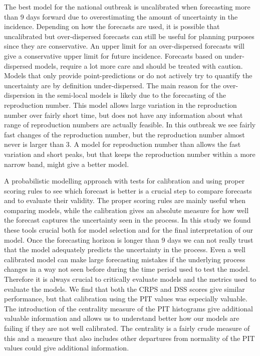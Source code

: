 \documentclass[12pt]{article}
\begin{document}
The best model for the national outbreak is uncalibrated when forecasting more than 9 days forward due to overestimating the amount of uncertainty in the incidence. Depending on how the forecasts are used, it is possible that uncalibrated but over-dispersed forecasts can still be useful for planning purposes since they are conservative. An upper limit for an over-dispersed forecasts will give a conservative upper limit for future incidence. Forecasts based on under-dispersed models, require a lot more care and should be treated with caution. Models that only provide point-predictions or do not actively try to quantify the uncertainty are by definition under-dispersed. The main reason for the over-dispersion in the semi-local models is likely due to the forecasting of the reproduction number. This model allows large variation in the reproduction number over fairly short time, but does not have any information about what range of reproduction numbers are actually feasible. In this outbreak we see fairly fast changes of the reproduction number, but the reproduction number almost never is larger than 3. A model for reproduction number than allows the fast variation and short peaks, but that keeps the reproduction number within a more narrow band, might give a better model.

A probabilistic modelling approach with tests for calibration and using proper scoring rules to see which forecast is better is a crucial step to compare forecasts and to evaluate their validity. The proper scoring rules are mainly useful when comparing models, while the calibration gives an absolute measure for how well the forecast captures the uncertainty seen in the process. In this study we found these tools crucial both for model selection and for the final interpretation of our model. Once the forecasting horizon is longer than 9 days we can not really trust that the model adequately predicts the uncertainty in the process. Even a well calibrated model can make large forecasting mistakes if the underlying process changes in a way not seen before during the time period used to test the model. Therefore it is always crucial to critically evaluate models and the metrics used to evaluate the models. We find that both the CRPS and DSS scores give similar performance, but that calibration using the PIT values was especially valuable. The introduction of the centrality measure of the PIT histograms give additional valuable information and allows us to understand better how our models are failing if they are not well calibrated. The centrality is a fairly crude measure of this and a measure that also includes other departures from normality of the PIT values could give additional information. 
\end{document}
